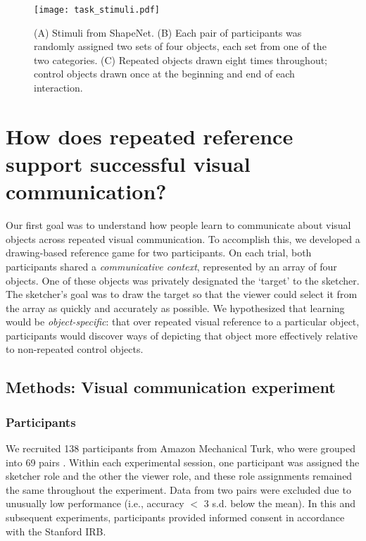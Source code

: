 
\begin{figure}
\begin{center}
\texttt{[image: task\_stimuli.pdf]}
\caption{(A) Stimuli from ShapeNet. (B) Each pair of participants was randomly assigned two sets of four objects, each set from one of the two categories. (C) Repeated objects drawn eight times throughout; control objects drawn once at the beginning and end of each interaction.}
\label{task_stimuli}
\vspace{-1em}
\end{center}
\end{figure}



\section{How does repeated reference support successful visual communication?}

Our first goal was to understand how people learn to communicate about visual objects across repeated visual communication.
To accomplish this, we developed a drawing-based reference game for two participants.
On each trial, both participants shared a \textit{communicative context}, represented by an array of four objects.
One of these objects was privately designated the `target' to the sketcher.
The sketcher's goal was to draw the target so that the viewer could select it from the array as quickly and accurately as possible.
We hypothesized that learning would be \emph{object-specific}: that over repeated visual reference to a particular object, participants would discover ways of depicting that object more effectively relative to non-repeated control objects.

\subsection{Methods: Visual communication experiment}

\subsubsection{Participants} We recruited 138 participants from Amazon Mechanical Turk, who were grouped into 69 pairs \cite{Hawkins15_RealTimeWebExperiments}.
Within each experimental session, one participant was assigned the sketcher role and the other the viewer role, and these role assignments remained the same throughout the experiment.
Data from two pairs were excluded due to unusually low performance (i.e., accuracy $<$ 3 s.d. below the mean). In this and subsequent experiments, participants provided informed consent in accordance with the Stanford IRB.

